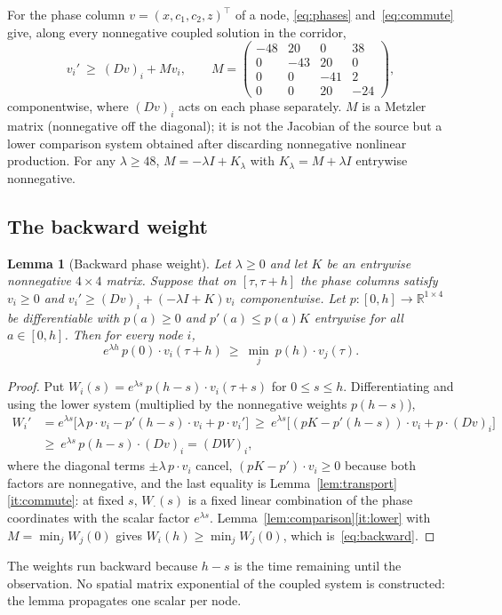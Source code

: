 \documentclass[11pt,a4paper]{article}
\theoremstyle{plain}
\newtheorem{lemma}[theorem]{Lemma}
\theoremstyle{definition}
\theoremstyle{remark}
\newcommand{\R}{\mathbb R}
\newcommand{\Dop}{D}
\begin{document}
For the phase column $v=(x,c_1,c_2,z)^{\top}$ of a node, \eqref{eq:phases} and~\eqref{eq:commute} give, along every nonnegative coupled solution in the corridor,
\begin{equation}\label{eq:lowersystem}
v_i'\ \ge\ (\Dop v)_i+M v_i,\qquad
M=\begin{pmatrix}-48&20&0&38\\0&-43&20&0\\0&0&-41&2\\0&0&20&-24\end{pmatrix},
\end{equation}
componentwise, where $(\Dop v)_i$ acts on each phase separately. $M$ is a Metzler matrix (nonnegative off the diagonal); it is not the Jacobian of the source but a lower comparison system obtained after discarding nonnegative nonlinear production. For any $\lambda\ge48$, $M=-\lambda I+K_\lambda$ with $K_\lambda=M+\lambda I$ entrywise nonnegative.

\subsection{The backward weight}
\begin{lemma}[Backward phase weight]\label{lem:backward}
Let $\lambda\ge0$ and let $K$ be an entrywise nonnegative $4\times4$ matrix. Suppose that on $[\tau,\tau+h]$ the phase columns satisfy $v_i\ge0$ and $v_i'\ge(\Dop v)_i+(-\lambda I+K)v_i$ componentwise. Let $p:[0,h]\to\R^{1\times4}$ be differentiable with $p(a)\ge0$ and $p'(a)\le p(a)K$ entrywise for all $a\in[0,h]$. Then for every node $i$,
\begin{equation}\label{eq:backward}
e^{\lambda h}\,p(0)\cdot v_i(\tau+h)\ \ge\ \min_j\ p(h)\cdot v_j(\tau).
\end{equation}
\end{lemma}
\begin{proof}
Put $W_i(s)=e^{\lambda s}\,p(h-s)\cdot v_i(\tau+s)$ for $0\le s\le h$. Differentiating and using the lower system (multiplied by the nonnegative weights $p(h-s)$),
\begin{align*}
W_i'&=e^{\lambda s}\bigl[\lambda\,p\cdot v_i-p'(h-s)\cdot v_i+p\cdot v_i'\bigr]
\ \ge\ e^{\lambda s}\bigl[(pK-p'(h-s))\cdot v_i+p\cdot(\Dop v)_i\bigr]\\
&\ge\ e^{\lambda s}\,p(h-s)\cdot(\Dop v)_i=(\Dop W)_i,
\end{align*}
where the diagonal terms $\pm\lambda\,p\cdot v_i$ cancel, $(pK-p')\cdot v_i\ge0$ because both factors are nonnegative, and the last equality is Lemma~\ref{lem:transport}\ref{it:commute}: at fixed $s$, $W_\cdot(s)$ is a fixed linear combination of the phase coordinates with the scalar factor $e^{\lambda s}$. Lemma~\ref{lem:comparison}\ref{it:lower} with $M=\min_jW_j(0)$ gives $W_i(h)\ge\min_jW_j(0)$, which is~\eqref{eq:backward}.
\end{proof}
The weights run backward because $h-s$ is the time remaining until the observation. No spatial matrix exponential of the coupled system is constructed: the lemma propagates one scalar per node.
\end{document}
